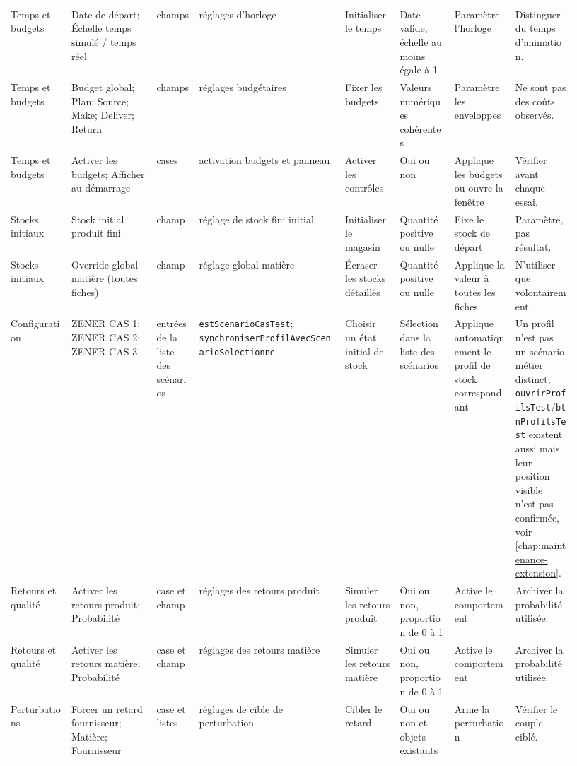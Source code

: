 \begin{landscape}
{\begin{longtable}{L{0.10\linewidth} L{0.14\linewidth} L{0.07\linewidth} L{0.24\linewidth} L{0.09\linewidth} L{0.09\linewidth} L{0.10\linewidth} L{0.10\linewidth}}
Temps et budgets & Date de départ; Échelle temps simulé / temps réel & champs & réglages d'horloge & Initialiser le temps & Date valide, échelle au moins égale à 1 & Paramètre l'horloge & Distinguer du temps d'animation. \\
Temps et budgets & Budget global; Plan; Source; Make; Deliver; Return & champs & réglages budgétaires & Fixer les budgets & Valeurs numériques cohérentes & Paramètre les enveloppes & Ne sont pas des coûts observés. \\
Temps et budgets & Activer les budgets; Afficher au démarrage & cases & activation budgets et panneau & Activer les contrôles & Oui ou non & Applique les budgets ou ouvre la fenêtre & Vérifier avant chaque essai. \\
Stocks initiaux & Stock initial produit fini & champ & réglage de stock fini initial & Initialiser le magasin & Quantité positive ou nulle & Fixe le stock de départ & Paramètre, pas résultat. \\
Stocks initiaux & Override global matière (toutes fiches) & champ & réglage global matière & Écraser les stocks détaillés & Quantité positive ou nulle & Applique la valeur à toutes les fiches & N'utiliser que volontairement. \\
Configuration & ZENER CAS 1; ZENER CAS 2; ZENER CAS 3 & entrées de la liste des scénarios & \texttt{est\allowbreak Scenario\allowbreak CasTest}; \texttt{synchroniser\allowbreak Profil\allowbreak Avec\allowbreak Scenario\allowbreak Selectionne} & Choisir un état initial de stock & Sélection dans la liste des scénarios & Applique automatiquement le profil de stock correspondant & Un profil n'est pas un scénario métier distinct; \texttt{ouvrirProfilsTest}/\texttt{btnProfilsTest} existent aussi mais leur position visible n'est pas confirmée, voir \cref{chap:maintenance-extension}. \\
Retours et qualité & Activer les retours produit; Probabilité & case et champ & réglages des retours produit & Simuler les retours produit & Oui ou non, proportion de 0 à 1 & Active le comportement & Archiver la probabilité utilisée. \\
Retours et qualité & Activer les retours matière; Probabilité & case et champ & réglages des retours matière & Simuler les retours matière & Oui ou non, proportion de 0 à 1 & Active le comportement & Archiver la probabilité utilisée. \\
Perturbations & Forcer un retard fournisseur; Matière; Fournisseur & case et listes & réglages de cible de perturbation & Cibler le retard & Oui ou non et objets existants & Arme la perturbation & Vérifier le couple ciblé. \\

\end{longtable}}
\end{landscape}
